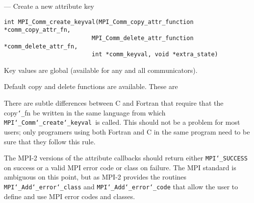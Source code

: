 \startmanpage
{}
--- Create a new attribute key  
\startvb\begin{verbatim}
int MPI_Comm_create_keyval(MPI_Comm_copy_attr_function *comm_copy_attr_fn, 
                         MPI_Comm_delete_attr_function *comm_delete_attr_fn, 
                         int *comm_keyval, void *extra_state)

\end{verbatim}
\endvb

\par
{}
\par
{}
Key values are global (available for any and all communicators).
\par
Default copy and delete functions are available.  These are
\par
There are subtle differences between C and Fortran that require that the
copy{\tt \char`\_}fn be written in the same language from which {\tt MPI{\tt \char`\_}Comm{\tt \char`\_}create{\tt \char`\_}keyval
}is called.
This should not be a problem for most users; only programers using both
Fortran and C in the same program need to be sure that they follow this rule.
\par
\par
{}
The MPI-2 versions of the attribute callbacks should return either
{\tt MPI{\tt \char`\_}SUCCESS} on success or a valid MPI error code or class on failure.
The MPI standard is ambiguous on this point, but as MPI-2 provides
the routines {\tt MPI{\tt \char`\_}Add{\tt \char`\_}error{\tt \char`\_}class} and {\tt MPI{\tt \char`\_}Add{\tt \char`\_}error{\tt \char`\_}code} that allow the
user to define and use MPI error codes and classes.
\par
